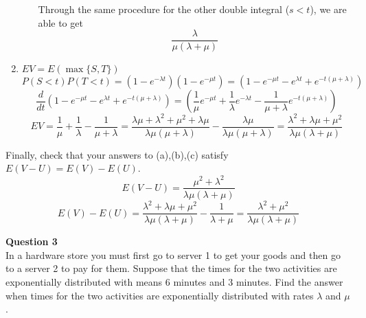 \documentclass[12pt]{article}
\begin{document}
\begin{enumerate}[label=(\alph*)]
\begin{itemize}
           Through the same procedure for the other double integral ($s<t$), we are able to get 
           $$\frac{\lambda}{\mu(\lambda+\mu)}$$
    \end{itemize}
    
    \newpage
    \item $EV=E(\max\{S,T\})$
    $$P(S<t)P(T<t)= (1-e^{-\lambda t})(1-e^{-\mu t})=(1-e^{-\mu t}-e^{\lambda t}+e^{-t(\mu+\lambda)}) $$
    $$\frac{d}{dt}(1-e^{-\mu t}-e^{\lambda t}+e^{-t(\mu+\lambda)}) 
    = \left(\frac{1}{\mu}e^{-\mu t} +\frac{1}{\lambda}e^{-\lambda t} - \frac{1}{\mu+\lambda} e^{-t(\mu+\lambda)}\right)$$
    $$EV = \frac{1}{\mu}+\frac{1}{\lambda}-\frac{1}{\mu+\lambda}=\frac{\lambda\mu+\lambda^2+\mu^2+\lambda\mu}{\lambda\mu(\mu+\lambda)}-\frac{\lambda\mu}{\lambda\mu(\mu+\lambda)} = \frac{\lambda^2+\lambda\mu+\mu^2}{\lambda\mu(\lambda+\mu)}
    $$
\end{enumerate}
Finally, check that your answers to (a),(b),(c) satisfy $E(V-U) = E(V)-E(U)$.
$$E(V-U) = \frac{\mu^2+\lambda^2}{\lambda\mu(\lambda+\mu)}$$
$$E(V)-E(U) = \frac{\lambda^2+\lambda\mu+\mu^2}{\lambda\mu(\lambda+\mu)} - \frac{1}{\lambda+\mu}
=\frac{\lambda^2+\mu^2}{\lambda\mu(\lambda+\mu)}$$

\vspace{1.5\baselineskip}
\textbf{Question 3}\\
In a hardware store you must first go to server 1 to get your goods and then go to a server 2 to pay for them. Suppose that the times for the two activities are exponentially distributed with means 6 minutes and 3 minutes. Find the answer when times for the two activities are exponentially distributed with rates $\lambda$ and $\mu$.
\end{document}
